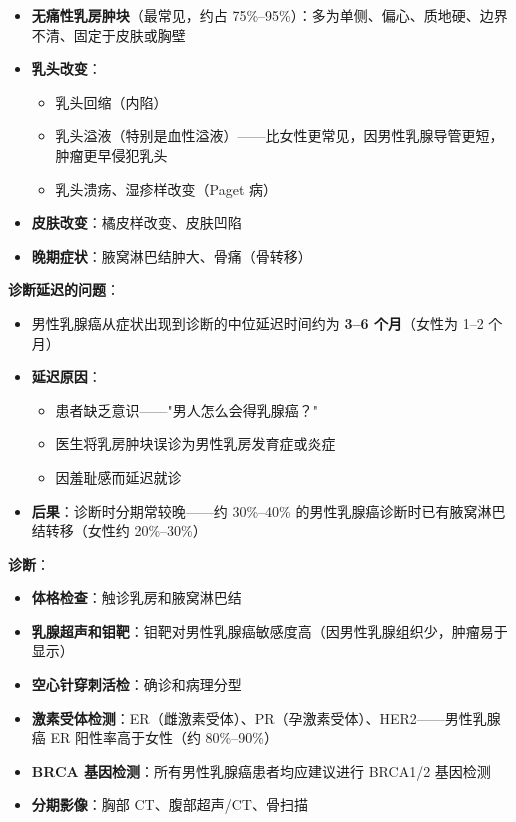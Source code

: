 \begin{enumerate}
\begin{itemize}[leftmargin=2cm]
	\item \textbf{无痛性乳房肿块}（最常见，约占 75\%--95\%）：多为单侧、偏心、质地硬、边界不清、固定于皮肤或胸壁
	\item \textbf{乳头改变}：
	\begin{itemize}
		\item 乳头回缩（内陷）
		\item 乳头溢液（特别是血性溢液）——比女性更常见，因男性乳腺导管更短，肿瘤更早侵犯乳头
		\item 乳头溃疡、湿疹样改变（Paget 病）
	\end{itemize}
	\item \textbf{皮肤改变}：橘皮样改变、皮肤凹陷
	\item \textbf{晚期症状}：腋窝淋巴结肿大、骨痛（骨转移）
\end{itemize}

\vspace{0.5em}
\noindent\textbf{诊断延迟的问题}：

\begin{itemize}[leftmargin=2cm]
	\item 男性乳腺癌从症状出现到诊断的中位延迟时间约为 \textbf{3--6 个月}（女性为 1--2 个月）
	\item \textbf{延迟原因}：
	\begin{itemize}
		\item 患者缺乏意识——"男人怎么会得乳腺癌？"
		\item 医生将乳房肿块误诊为男性乳房发育症或炎症
		\item 因羞耻感而延迟就诊
	\end{itemize}
	\item \textbf{后果}：诊断时分期常较晚——约 30\%--40\% 的男性乳腺癌诊断时已有腋窝淋巴结转移（女性约 20\%--30\%）
\end{itemize}

\vspace{0.5em}
\noindent\textbf{诊断}：

\begin{itemize}[leftmargin=2cm]
	\item \textbf{体格检查}：触诊乳房和腋窝淋巴结
	\item \textbf{乳腺超声和钼靶}：钼靶对男性乳腺癌敏感度高（因男性乳腺组织少，肿瘤易于显示）
	\item \textbf{空心针穿刺活检}：确诊和病理分型
	\item \textbf{激素受体检测}：ER（雌激素受体）、PR（孕激素受体）、HER2——男性乳腺癌 ER 阳性率高于女性（约 80\%--90\%）
	\item \textbf{BRCA 基因检测}：所有男性乳腺癌患者均应建议进行 BRCA1/2 基因检测
	\item \textbf{分期影像}：胸部 CT、腹部超声/CT、骨扫描
\end{itemize}


\end{enumerate}
